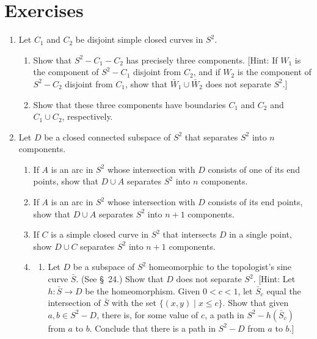 \section*{Exercises}
\begin{enumerate}[itemsep=0.4em, parsep=0pt, topsep=0pt, partopsep=0pt, leftmargin=*, label=\arabic*., ref=\arabic*]
\item Let \(C_{1}\) and \(C_{2}\) be disjoint simple closed curves in \(S^{2}\).
 \begin{enumerate}[itemsep=0.2em, parsep=0pt, topsep=0pt, partopsep=0pt, leftmargin=*, label=(\alph*), align=left]
 \item Show that \(S^{2} - C_{1} - C_{2}\) has precisely three components. [Hint: If \(W_{1}\) is the component of \(S^{2} - C_{1}\) disjoint from \(C_{2}\), and if \(W_{2}\) is the component of \(S^{2} - C_{2}\) disjoint from \(C_{1}\), show that \(\bar{W}_{1} \cup {\bar{W}}_{2}\) does not separate \(S^{2}\).]
 \item Show that these three components have boundaries \(C_{1}\) and \(C_{2}\) and \(C_{1} \cup {C}_{2}\), respectively.
 \end{enumerate}
\item Let \(D\) be a closed connected subspace of \(S^{2}\) that separates \(S^{2}\) into \(n\) components.
 \begin{enumerate}[itemsep=0.2em, parsep=0pt, topsep=0pt, partopsep=0pt, leftmargin=*, label=(\alph*), align=left]
 \item If \(A\) is an arc in \(S^{2}\) whose intersection with \(D\) consists of one of its end points, show that \(D \cup A\) separates \(S^{2}\) into \(n\) components.
 \item If \(A\) is an arc in \(S^{2}\) whose intersection with \(D\) consists of its end points, show that \(D \cup A\) separates \(S^{2}\) into \(n + 1\) components.
 \item If \(C\) is a simple closed curve in \(S^{2}\) that intersects \(D\) in a single point, show \(D \cup C\) separates \(S^{2}\) into \(n + 1\) components.
\item[*3.]
 \begin{enumerate}[itemsep=0.2em, parsep=0pt, topsep=0pt, partopsep=0pt, leftmargin=*, label=(\alph*), align=left]
 \item Let \(D\) be a subspace of \(S^{2}\) homeomorphic to the topologist's sine curve \(\bar{S}\). (See \S\ 24.) Show that \(D\) does not separate \(S^{2}\). [Hint: Let \(h : \bar{S} \rightarrow D\) be the homeomorphism. Given \(0 < c < 1\), let \(\bar{S}_{c}\) equal the intersection of \(\bar{S}\) with the set \(\{ ( {x,y}) \mid x \leq c\}\). Show that given \(a,b \in {S}^{2} - D\), there is, for some value of \(c\), a path in \(S^{2} - h( \bar{S}_{c})\) from \(a\) to \(b\). Conclude that there is a path in \(S^{2} - D\) from \(a\) to \(b\).]

\end{enumerate}
\end{enumerate}
\end{enumerate}
